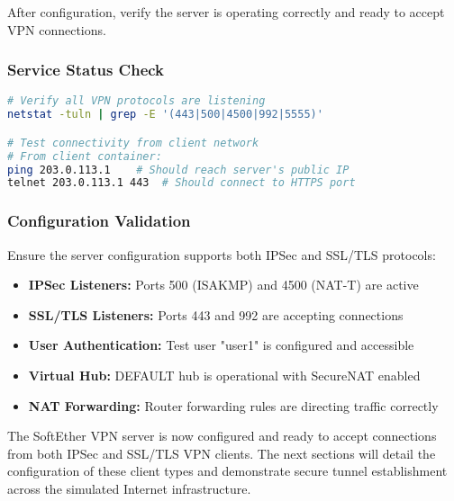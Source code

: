 After configuration, verify the server is operating correctly and ready to accept VPN connections.

\subsubsection{Service Status Check}

\begin{lstlisting}[language=bash]
# Verify all VPN protocols are listening
netstat -tuln | grep -E '(443|500|4500|992|5555)'

# Test connectivity from client network
# From client container:
ping 203.0.113.1    # Should reach server's public IP
telnet 203.0.113.1 443  # Should connect to HTTPS port
\end{lstlisting}

\subsubsection{Configuration Validation}

Ensure the server configuration supports both IPSec and SSL/TLS protocols:

\begin{itemize}
    \item \textbf{IPSec Listeners:} Ports 500 (ISAKMP) and 4500 (NAT-T) are active
    \item \textbf{SSL/TLS Listeners:} Ports 443 and 992 are accepting connections
    \item \textbf{User Authentication:} Test user "user1" is configured and accessible
    \item \textbf{Virtual Hub:} DEFAULT hub is operational with SecureNAT enabled
    \item \textbf{NAT Forwarding:} Router forwarding rules are directing traffic correctly
\end{itemize}

The SoftEther VPN server is now configured and ready to accept connections from both IPSec and SSL/TLS VPN clients. The next sections will detail the configuration of these client types and demonstrate secure tunnel establishment across the simulated Internet infrastructure.
